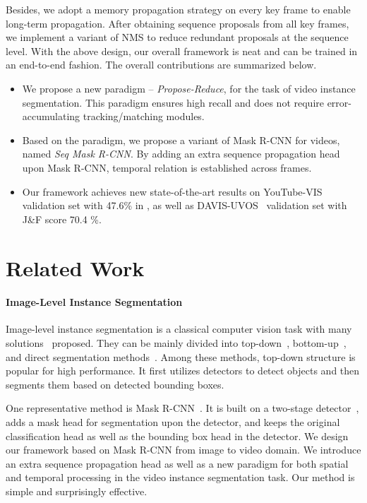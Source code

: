 \documentclass[10pt,twocolumn,letterpaper]{article}
\begin{document}
	Besides, we adopt a memory propagation strategy on every key frame to enable long-term propagation.
	After obtaining sequence proposals from all key frames, we implement a variant of NMS to reduce redundant proposals at the sequence level.
	With the above design, our overall framework is neat and can be trained in an end-to-end fashion.
	The overall contributions are summarized below.
	\begin{itemize}
		\item We propose a new paradigm -- {\it Propose-Reduce}, for the task of video instance segmentation. This paradigm ensures high recall and does not require error-accumulating tracking/matching modules.
		\item Based on the paradigm, we propose a variant of Mask R-CNN for videos, named {\it Seq Mask R-CNN}. By adding an extra sequence propagation head upon Mask R-CNN, temporal relation is established across frames. 
		\item Our framework achieves new state-of-the-art results on YouTube-VIS~\cite{yang2019vis} validation set with 47.6\% in , as well as DAVIS-UVOS~\cite{Caelles_arXiv_2019} validation set with {J\&F} score 70.4 \%.
		
	\end{itemize}
	
	\section{Related Work}
	\paragraph{Image-Level Instance Segmentation}
	Image-level instance segmentation is a classical computer vision task with many solutions~\cite{he2017mask,huang2019mask,liu2018path,wang2020solo,chen2019tensormask,xie2020polarmasK,bolya2019yolact,qi2020pointins} proposed. 
	They can be mainly divided into top-down~\cite{he2017mask,huang2019mask,liu2018path,bolya2019yolact,lee2020centermask}, bottom-up~\cite{liu2017sgn,newell2017associative}, and direct segmentation methods~\cite{wang2020solo,xie2020polarmasK}. 
	Among these methods, top-down structure is popular for high performance.
	It first utilizes detectors to detect objects and then segments them based on detected bounding boxes. 
	
	One representative method is Mask R-CNN~\cite{he2017mask}. It is built on a two-stage detector~\cite{ren2015faster}, adds a mask head for segmentation upon the detector, and keeps the original classification head as well as the bounding box head in the detector. 
	We design our framework based on Mask R-CNN from image to video domain. We introduce an extra sequence propagation head as well as a new paradigm for both spatial and temporal processing in the video instance segmentation task. Our method is simple and surprisingly effective.
	
\end{document}
